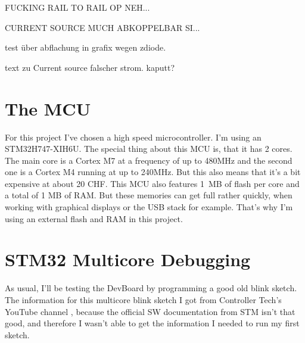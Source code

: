 FUCKING RAIL TO RAIL OP NEH...

CURRENT SOURCE MUCH ABKOPPELBAR SI...

test über abflachung in grafix wegen zdiode.

text zu Current source falscher strom. kaputt?







\newpage
\section{The MCU}
For this project I've chosen a high speed microcontroller. I'm using an STM32H747-XIH6U. The special thing about this MCU is, that it has 2 cores. The main core is a Cortex M7 at a frequency of up to 480MHz and the second one is a Cortex M4 running at up to 240MHz. But this also means that it's a bit expensive at about 20 CHF. This MCU also features 1 MB of flash per core and a total of 1 MB of RAM. But these memories can get full rather quickly, when working with graphical displays or the USB stack for example. That's why I'm using an external flash and RAM in this project.


\section{STM32 Multicore Debugging}
As usual, I'll be testing the DevBoard by programming a good old blink sketch. The information for this multicore blink sketch I got from Controller Tech's YouTube channel \cite{YT_CT_Mutlicore_Debugging}, because the official SW documentation from STM isn't that good, and therefore I wasn't able to get the information I needed to run my first sketch.

